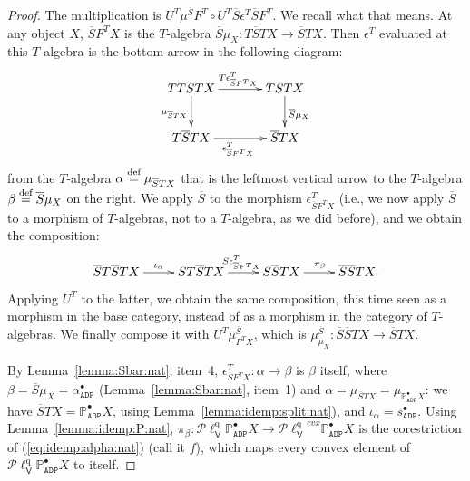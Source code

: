 \documentclass[preprint,12pt]{elsarticle}
\newcommand\eqdef{\mathrel{\buildrel \text{def}\over=}}
\newcommand\Pred{\mathbb{P}}
\newcommand\Angel{{\mathtt{A}}}
\newcommand\Demon{{\mathtt{D}}}
\newcommand\Nature{{\mathtt{P}}}
\newcommand\ADN{{\Angel\Demon\Nature}}
\newcommand\Vt{\mathsf{V}}
\newcommand\quasi{\mathrm{q}} %
\newcommand\QL{\Plotkin^\quasi}
\newcommand\QLV{\QL_\Vt}
\newcommand\Plotkin{\mathcal P\ell} %
\begin{document}
\begin{proof}
  The multiplication is
  $U^T \mu^{\overline S} F^T \circ U^T \overline S \epsilon^T
  \overline S F^T$.  We recall what that means.  At any object $X$,
  $\overline S F^T X$ is the $T$-algebra
  $\overline S\mu_X \colon T \overline S T X \to \overline S T X$.
  Then $\epsilon^T$ evaluated at this $T$-algebra is the bottom arrow
  in the following diagram:
  \[
    \xymatrix@C+10pt{
      TT\overline S T X
      \ar[d]_{\mu_{\overline S T X}}
      \ar[r]^{T \epsilon^T_{\overline S F^T X}}
      & T \overline S T X
      \ar[d]^{\overline S \mu_X}
      \\
      T \overline S T X
      \ar[r]_{\epsilon^T_{\overline S F^T X}}
      & \overline S T X
    }
  \]
  from the $T$-algebra $\alpha \eqdef \mu_{\overline S T X}$ that is
  the leftmost vertical arrow to the $T$-algebra
  $\beta \eqdef \overline S \mu_X$ on the right.  We apply $\overline
  S$ to the morphism $\epsilon^T_{\overline S F^T X}$ (i.e., we now
  apply $\overline S$ to a morphism of $T$-algebras, not to a
  $T$-algebra, as we did before), and we obtain the composition:
  \begin{equation}
    \label{eq:mu:part:nat}
    \xymatrix{
      \overline S T \overline S T X
      \ar[r]^{\iota_\alpha}
      &
      S T \overline S T X
      \ar[r]^{S \epsilon^T_{\overline S F^T X}}
      &
      S \overline S T X
      \ar[r]^{\pi_\beta}
      &
      \overline S \overline S T X.
    }
  \end{equation}
  Applying $U^T$ to the latter, we obtain the same composition, this
  time seen as a morphism in the base category, instead of as a
  morphism in the category of $T$-algebras.  We finally compose it
  with $U^T \mu^{\overline S}_{F^T X}$, which is
  $\mu^{\overline S}_{\mu_X} \colon \overline S \overline S T X \to
  \overline S T X$.

  By Lemma~\ref{lemma:Sbar:nat}, item~4,
  $\epsilon^T_{\overline S F^T X} \colon \alpha \to \beta$ is $\beta$
  itself, where $\beta = \overline S \mu_X = \alpha_\ADN^\bullet$
  (Lemma~\ref{lemma:Sbar:nat}, item~1) and
  $\alpha = \mu_{\overline S T X} = \mu_{\Pred_\ADN^\bullet X}$: we
  have $\overline S T X = \Pred_\ADN^\bullet X$, using
  Lemma~\ref{lemma:idemp:split:nat}), and
  $\iota_\alpha = s_\ADN^\bullet$.  Using
  Lemma~\ref{lemma:idemp:P:nat},
  $\pi_\beta \colon \QLV {\Pred_\ADN^\bullet X} \to {\QLV}^{cvx}
  {\Pred_\ADN^\bullet X}$ is the corestriction of
  (\ref{eq:idemp:alpha:nat}) (call it $f$), which maps every convex
  element of $\QLV {\Pred_\ADN^\bullet X}$ to itself.


\end{proof}
\end{document}
